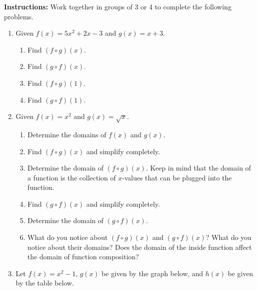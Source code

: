 




\noindent \textbf{Instructions:}  Work together in groups of  3 or 4 to complete the following problems.




\begin{enumerate}
\item Given $f(x)=5x^2+2x-3$ and $g(x)=x+3$.
\begin{enumerate}
\item Find $(f \circ g)(x)$.
\vfill


\item  Find $(g \circ f)(x)$.
\vfill
 
 \item Find $(f \circ g)(1)$.
 \vfill
 
 \item  Find $(g \circ f)(1)$.
 
 \vfill
 \end{enumerate}

\newpage

\item Given $f(x)=x^2$ and $g(x)=\sqrt{x}$.
\begin{enumerate}
\item Determine the domains of $f(x)$ and $g(x)$.\vfill
\item Find $(f \circ g)(x)$ and simplify completely.\vfill
\item Determine the domain of $(f \circ g)(x)$.  Keep in mind that the domain of a function is the collection of $x$-values that can be plugged into the function.\vfill
\item  Find $(g \circ f)(x)$ and simplify completely.\vfill
\item Determine the domain of $(g \circ f)(x)$.\vfill
\item What do you notice about $(f \circ g)(x)$ and $(g \circ f)(x)$?  What do you notice about their domains?  Does the domain of the inside function affect the domain of function composition?\vfill
\end{enumerate}




\vfill

\newpage 

\item Let $f(x)=x^2-1$, $g(x)$ be given by the graph below, and $h(x)$ be given by the table below.



\end{enumerate}
